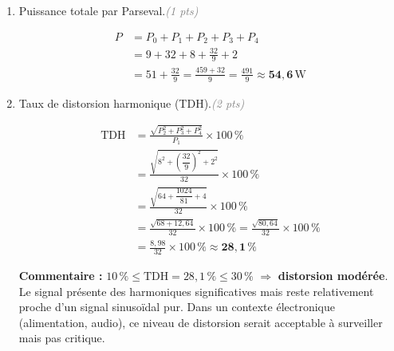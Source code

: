 \documentclass[a4paper,11pt]{article}
\newcommand{\reponse}[1]{%
  \begin{tcolorbox}[corrbox={}]
    #1
  \end{tcolorbox}%
}
\newcommand{\pts}[1]{\hfill\textcolor{gray}{\small\textit{(#1 pts)}}}
\begin{document}
\begin{enumerate}[label=\textbf{\arabic*.}, leftmargin=*, itemsep=0.4cm]
  \item Puissance totale par Parseval.\pts{1}

  \reponse{
    \begin{align*}
      P &= P_0 + P_1 + P_2 + P_3 + P_4 \\
        &= 9 + 32 + 8 + \frac{32}{9} + 2 \\
        &= 51 + \frac{32}{9}
         = \frac{459 + 32}{9}
         = \frac{491}{9}
         \approx \mathbf{54{,}6\,\mathrm{W}}
    \end{align*}
  }

  \item Taux de distorsion harmonique (TDH).\pts{2}

  \reponse{
    \begin{align*}
      \mathrm{TDH} &= \frac{\sqrt{P_2^2 + P_3^2 + P_4^2}}{P_1}\times 100\,\%\\[6pt]
                   &= \frac{\sqrt{8^2 + \left(\dfrac{32}{9}\right)^2 + 2^2}}{32}\times 100\,\%\\[6pt]
                   &= \frac{\sqrt{64 + \dfrac{1024}{81} + 4}}{32}\times 100\,\%\\[6pt]
                   &= \frac{\sqrt{68 + 12{,}64}}{32}\times 100\,\%
                    = \frac{\sqrt{80{,}64}}{32}\times 100\,\%\\[6pt]
                   &= \frac{8{,}98}{32}\times 100\,\%
                    \approx \mathbf{28{,}1\,\%}
    \end{align*}

    \begin{tcolorbox}[colback=yellow!10!white, colframe=yellow!60!black,
                      sharp corners, boxrule=0.5pt,
                      left=5pt, right=5pt, top=3pt, bottom=3pt]
      \textbf{Commentaire :} $10\,\% \leq \mathrm{TDH} = 28{,}1\,\% \leq 30\,\%$
      \; $\Rightarrow$ \textbf{distorsion modérée}.
      Le signal présente des harmoniques significatives mais reste relativement proche d'un signal
      sinusoïdal pur. Dans un contexte électronique (alimentation, audio), ce niveau de distorsion
      serait acceptable à surveiller mais pas critique.
    \end{tcolorbox}
  }

\end{enumerate}
\end{document}
